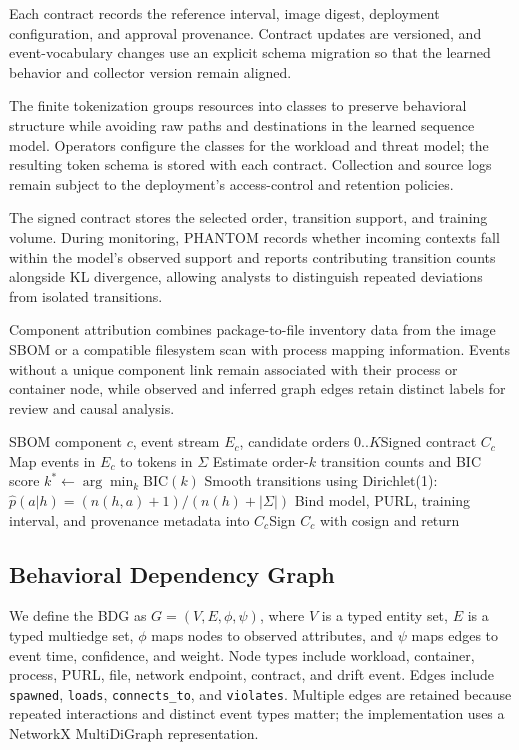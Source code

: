 \documentclass[conference]{IEEEtran}
\begin{document}
Each contract records the reference interval, image digest, deployment configuration, and approval provenance. Contract updates are versioned, and event-vocabulary changes use an explicit schema migration so that the learned behavior and collector version remain aligned.

The finite tokenization groups resources into classes to preserve behavioral structure while avoiding raw paths and destinations in the learned sequence model. Operators configure the classes for the workload and threat model; the resulting token schema is stored with each contract. Collection and source logs remain subject to the deployment's access-control and retention policies.

The signed contract stores the selected order, transition support, and training volume. During monitoring, PHANTOM records whether incoming contexts fall within the model's observed support and reports contributing transition counts alongside KL divergence, allowing analysts to distinguish repeated deviations from isolated transitions.

Component attribution combines package-to-file inventory data from the image SBOM or a compatible filesystem scan with process mapping information. Events without a unique component link remain associated with their process or container node, while observed and inferred graph edges retain distinct labels for review and causal analysis.

\begin{algorithm}[t]\caption{Behavioral contract construction}\label{alg:contract}\begin{algorithmic}[1]
\Require SBOM component $c$, event stream $E_c$, candidate orders $0..K$\Ensure Signed contract $C_c$
\State Map events in $E_c$ to tokens in $\Sigma$
\State Estimate order-$k$ transition counts and BIC score\EndFor
\State $k^* \gets \arg\min_k \mathrm{BIC}(k)$
\State Smooth transitions using Dirichlet(1): $\hat p(a|h)=(n(h,a)+1)/(n(h)+|\Sigma|)$\EndFor
\State Bind model, PURL, training interval, and provenance metadata into $C_c$\State Sign $C_c$ with cosign and return\end{algorithmic}\end{algorithm}

\subsection{Behavioral Dependency Graph}
We define the BDG as $G=(V,E,\phi,\psi)$, where $V$ is a typed entity set, $E$ is a typed multiedge set, $\phi$ maps nodes to observed attributes, and $\psi$ maps edges to event time, confidence, and weight. Node types include workload, container, process, PURL, file, network endpoint, contract, and drift event. Edges include \texttt{spawned}, \texttt{loads}, \texttt{connects\_to}, and \texttt{violates}. Multiple edges are retained because repeated interactions and distinct event types matter; the implementation uses a NetworkX MultiDiGraph representation.
\end{document}
